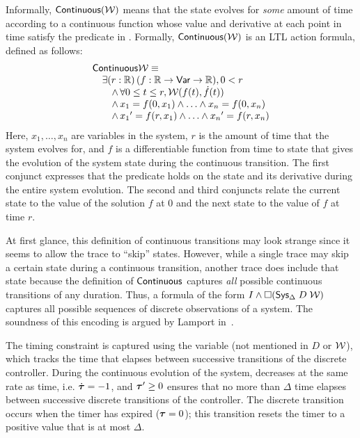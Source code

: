 Informally, $\mathsf{Continuous}{(\mathcal{W})}$ means that the state evolves for
\emph{some} amount of time according to a continuous function whose value
and derivative at each point in time satisfy the predicate in \W.
Formally, $\mathsf{Continuous}{(\mathcal{W})}$ is an LTL action formula, defined as follows:
\[\begin{array}{l}
\mathsf{Continuous}{\mathcal{W}} \equiv \\
\quad \exists (r : \mathbb{R})\, (f : \mathbb{R} \rightarrow \textsf{Var} \rightarrow \mathbb{R}), 0 < r \\
\qquad \wedge\, \forall 0 \leq t \leq r, \mathcal{W}(f(t),\dot{f}(t)) \\
\qquad \wedge\, x_1 = f(0,x_1) \wedge \ldots \wedge x_n = f(0,x_n) \\
\qquad \wedge\, x_1{}^\prime = f(r,x_1) \wedge \ldots \wedge x_n{}^\prime = f(r,x_n)
\end{array}
\]
Here, $x_1,\ldots,x_n$ are variables in the system, $r$ is the amount of
time that the system evolves for, and $f$ is a differentiable function from
time to state that gives the evolution of the system state during the
continuous transition. The first conjunct expresses that the predicate \W
holds on the state and its derivative during the entire system evolution.
The second and third conjuncts relate the current state to the value of the
solution $f$ at 0 and the next state to the value of $f$ at time $r$.

At first glance, this definition of continuous transitions may look strange
since it seems to allow the trace to ``skip'' states.  However, while a
single trace may skip a certain state during a continuous transition,
another trace does include that state because the definition of
$\mathsf{Continuous}{}$ captures \emph{all} possible continuous transitions of any
duration.  Thus, a formula of the form
$I\wedge\Box{({\textsf{Sys}}{}_{\Delta}\;D\;\ensuremath{\mathcal{W}})}$ captures all possible sequences of
discrete observations of a system.  The soundness of this encoding is
argued by Lamport in~\cite{lamport2005real}.

The timing constraint is captured using the variable \tlavar{\tau} (not
mentioned in $D$ or $\mathcal{W}$), which tracks the time that elapses between
successive transitions of the discrete controller.  During the continuous
evolution of the system, \tlavar{\tau} decreases at the same rate as time,
i.e. $\dot{\boldsymbol{\tau}} = -1$, and $\boldsymbol{\tau}^\prime \geq 0$ ensures that
no more than $\Delta$ time elapses between successive discrete transitions
of the controller.  The discrete transition occurs when the timer has
expired ($\boldsymbol{\tau} = 0$); this transition resets the timer to a
positive value that is at most $\Delta$.
